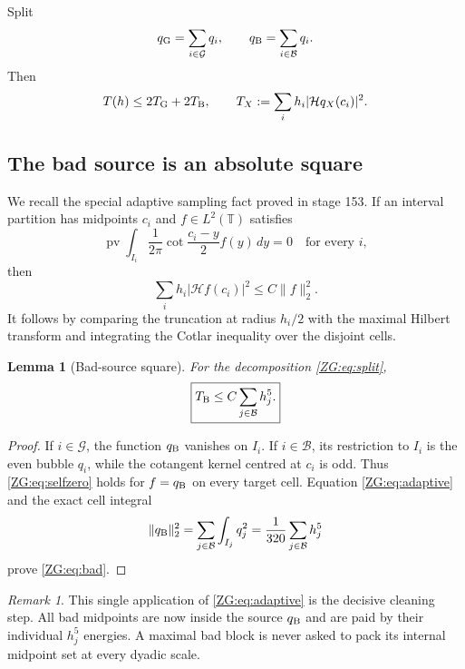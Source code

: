 \documentclass[11pt]{amsart}
\numberwithin{equation}{section}
\newtheorem{lemma}[theorem]{Lemma}
\theoremstyle{definition}
\theoremstyle{remark}
\newtheorem{remark}[theorem]{Remark}
\newcommand{\T}{\mathbb T}
\newcommand{\Hil}{\mathcal H}
\begin{document}
Split
\begin{equation}\label{ZG:eq:split}
 q_{\rm G}=\sum_{i\in\mathcal G}q_i,
 \qquad q_{\rm B}=\sum_{i\in\mathcal B}q_i.
\end{equation}
Then
\begin{equation}\label{ZG:eq:Tsplit}
 T(h)\le2T_{\rm G}+2T_{\rm B},
 \qquad
 T_X:=\sum_i h_i|\Hil q_X(c_i)|^2.
\end{equation}

\subsection{The bad source is an absolute square}

We recall the special adaptive sampling fact proved in stage 153.  If an
interval partition has midpoints $c_i$ and $f\in L^2(\T)$ satisfies
\begin{equation}\label{ZG:eq:selfzero}
 \operatorname {pv}\int_{I_i}\frac1{2\pi}
 \cot\frac{c_i-y}{2}f(y)\,dy=0
 \quad\text{for every }i,
\end{equation}
then
\begin{equation}\label{ZG:eq:adaptive}
 \sum_i h_i|\Hil f(c_i)|^2\le C\|f\|_2^2.
\end{equation}
It follows by comparing the truncation at radius $h_i/2$ with the
maximal Hilbert transform and integrating the Cotlar inequality over the
disjoint cells.

\begin{lemma}[Bad-source square]\label{ZG:lem:bad}
For the decomposition \eqref{ZG:eq:split},
\begin{equation}\label{ZG:eq:bad}
 \boxed{
 T_{\rm B}\le C\sum_{j\in\mathcal B}h_j^5.}
\end{equation}
\end{lemma}

\begin{proof}
If $i\in\mathcal G$, the function $q_{\rm B}$ vanishes on $I_i$.  If
$i\in\mathcal B$, its restriction to $I_i$ is the even bubble $q_i$,
while the cotangent kernel centred at $c_i$ is odd.  Thus
\eqref{ZG:eq:selfzero} holds for $f=q_{\rm B}$ on every target cell.
Equation \eqref{ZG:eq:adaptive} and the exact cell integral
\[
 \|q_{\rm B}\|_2^2
 =\sum_{j\in\mathcal B}\int_{I_j}q_j^2
 =\frac1{320}\sum_{j\in\mathcal B}h_j^5
\]
prove \eqref{ZG:eq:bad}.
\end{proof}

\begin{remark}
This single application of \eqref{ZG:eq:adaptive} is the decisive cleaning
step.  All bad midpoints are now inside the source $q_{\rm B}$ and are
paid by their individual $h_j^5$ energies.  A maximal bad block is never
asked to pack its internal midpoint set at every dyadic scale.
\end{remark}
\end{document}
